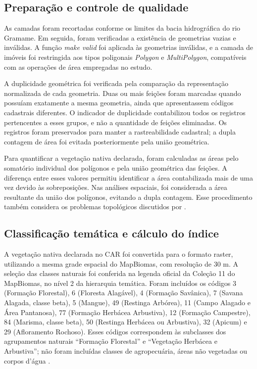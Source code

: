 \subsection{Preparação e controle de qualidade}

As camadas foram recortadas conforme os limites da bacia hidrográfica do rio Gramame. Em seguida, foram verificadas a existência de geometrias vazias e inválidas. A função \textit{make valid} foi aplicada às geometrias inválidas, e a camada de imóveis foi restringida aos tipos poligonais \textit{Polygon} e \textit{MultiPolygon}, compatíveis com as operações de área empregadas no estudo.

A duplicidade geométrica foi verificada pela comparação da representação normalizada de cada geometria. Duas ou mais feições foram marcadas quando possuíam exatamente a mesma geometria, ainda que apresentassem códigos cadastrais diferentes. O indicador de duplicidade contabilizou todos os registros pertencentes a esses grupos, e não a quantidade de feições eliminadas. Os registros foram preservados para manter a rastreabilidade cadastral; a dupla contagem de área foi evitada posteriormente pela união geométrica.

Para quantificar a vegetação nativa declarada, foram calculadas as áreas pelo somatório individual dos polígonos e pela união geométrica das feições. A diferença entre esses valores permitiu identificar a área contabilizada mais de uma vez devido às sobreposições. Nas análises espaciais, foi considerada a área resultante da união dos polígonos, evitando a dupla contagem. Esse procedimento também considera os problemas topológicos discutidos por .

\subsection{Classificação temática e cálculo do índice}


A vegetação nativa declarada no CAR foi convertida para o formato raster, utilizando a mesma grade espacial do MapBiomas, com resolução de 30 m. A seleção das classes naturais foi conferida na legenda oficial da Coleção 11 do MapBiomas, no nível 2 da hierarquia temática. Foram incluídos os códigos 3 (Formação Florestal), 6 (Floresta Alagável), 4 (Formação Savânica), 7 (Savana Alagada, classe beta), 5 (Mangue), 49 (Restinga Arbórea), 11 (Campo Alagado e Área Pantanosa), 77 (Formação Herbácea Arbustiva), 12 (Formação Campestre), 84 (Marisma, classe beta), 50 (Restinga Herbácea ou Arbustiva), 32 (Apicum) e 29 (Afloramento Rochoso). Esses códigos correspondem às subclasses dos agrupamentos naturais ``Formação Florestal'' e ``Vegetação Herbácea e Arbustiva''; não foram incluídas classes de agropecuária, áreas não vegetadas ou corpos d'água \cite{mapbiomaslegenda2026}.

